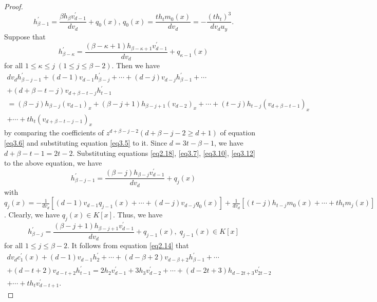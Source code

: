 \documentclass[12pt, twoside, leqno]{article}
\theoremstyle{definition}
\numberwithin{equation}{section}
\begin{document}
\begin{proof}
\begin{equation}\label{eq3.11}
h_{\beta-1}^{'}=\frac{\beta h_{\beta}v_{d-1}^{'}}{dv_{d}}+q_{0}(x),\,q_{0}(x)=\frac{th_{t}m_{0}(x)}{dv_{d}}=-\frac{(th_t)^3}{dv_du_y}.
\end{equation}
Suppose that
\begin{equation}\label{eq3.12}
h_{\beta-\kappa}^{'}=\frac{(\beta-\kappa+1) h_{\beta-\kappa+1}v_{d-1}^{'}}{dv_{d}}+q_{\kappa-1}(x)
\end{equation}
for all $1\leq \kappa\leq j\;(1\leq j\leq\beta-2)$. Then we have
\begin{equation}\nonumber
\begin{split}
dv_{d}h_{\beta-j-1}^{'}+(d-1)v_{d-1}h_{\beta-j}^{'}+\cdots+(d-j)v_{d-j}h_{\beta-1}^{'}+\cdots\\
+(d+\beta-t-j)v_{d+\beta-t-j}h_{t-1}^{'}\\
=(\beta-j)h_{\beta-j}(v_{d-1})_x+(\beta-j+1)h_{\beta-j+1}(v_{d-2})_x+\cdots+(t-j)h_{t-j}(v_{d+\beta-t-1})_x\\
+\cdots+th_{t}(v_{d+\beta-t-j-1})_x
\end{split}
\end{equation}
by comparing the coefficients of $z^{d+\beta-j-2}$$(d+\beta-j-2\geq d+1)$ of equation \eqref{eq3.6} and substituting equation \eqref{eq3.5} to it. Since $d=3t-\beta-1$, we have $d+\beta-t-1=2t-2$. Substituting equations \eqref{eq2.18}, \eqref{eq3.7}, \eqref{eq3.10}, \eqref{eq3.12} to the above equation, we have
\begin{equation}\nonumber
h_{\beta-j-1}^{'}=\frac{(\beta-j)h_{\beta-j}v_{d-1}^{'}}{dv_{d}}+q_{j}(x)
\end{equation}
with $q_{j}(x)=
-\frac{1}{dv_{d}}[(d-1)v_{d-1}q_{j-1}(x)+\cdots+(d-j)v_{d-j}q_{0}(x)]+\frac{1}{dv_{d}}[(t-j)h_{t-j}m_{0}(x)+\cdots+th_{t}m_{j}(x)]$.
Clearly, we have $q_j(x)\in K[x]$. Thus, we have
\begin{equation}\label{eq3.13}
h_{\beta-j}^{'}=\frac{(\beta-j+1) h_{\beta-j+1}v_{d-1}^{'}}{dv_{d}}+q_{j-1}(x),\;q_{j-1}(x)\in K[x]
\end{equation}
for all $1\leq j\leq\beta-2$. It follows from equation \eqref{eq2.14} that
\begin{equation}\nonumber
\begin{split}
dv_{d}c_{1}^{'}(x)+(d-1)v_{d-1}h_{2}^{'}+\cdots+(d-\beta+2)v_{d-\beta+2}h_{\beta-1}^{'}+\cdots\\+(d-t+2)v_{d-t+2}h_{t-1}^{'}
=2h_{2}v_{d-1}^{'}+3h_3v_{d-2}^{'}+\cdots+(d-2t+3)h_{d-2t+3}v_{2t-2}^{'}\\+\cdots+th_{t}v_{d-t+1}^{'}.

\end{split}
\end{equation}$$
\end{proof}
\end{document}
